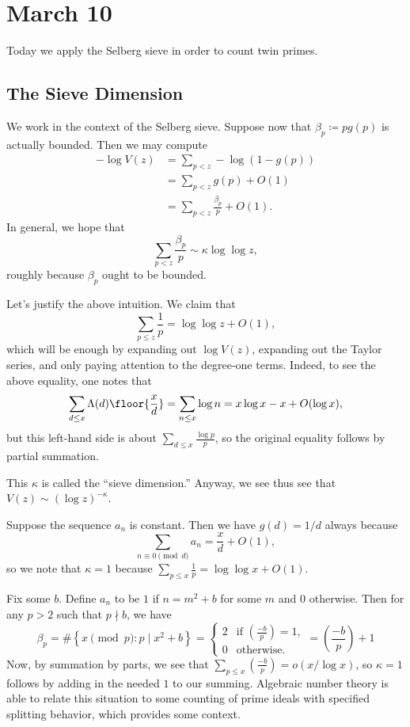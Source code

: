\documentclass[../notes.tex]{subfiles}
\begin{document}
\section{March 10}

Today we apply the Selberg sieve in order to count twin primes.

\subsection{The Sieve Dimension}
We work in the context of the Selberg sieve. Suppose now that $\beta_p\coloneqq pg(p)$ is actually bounded. Then we may compute
\begin{align*}
	-\log V(z) &= \sum_{p<z}-\log(1-g(p)) \\
	&= \sum_{p<z}g(p)+O(1) \\
	&= \sum_{p<z}\frac{\beta_p}p+O(1).
\end{align*}
In general, we hope that
\[\sum_{p<z}\frac{\beta_p}p\sim\kappa\log\log z,\]
roughly because $\beta_p$ ought to be bounded.
\begin{remark}
	Let's justify the above intuition. We claim that
	\[\sum_{p\le z}\frac1p=\log\log z+O(1),\]
	which will be enough by expanding out $\log V(z)$, expanding out the Taylor series, and only paying attention to the degree-one terms. Indeed, to see the above equality, one notes that
	\[\sum_{d\le x}\Lambda(d)\floor{\frac xd}=\sum_{n\le x}\log n=x\log x-x+O(\log x),\]
	but this left-hand side is about $\sum_{d\le x}\frac{\log p}p$, so the original equality follows by partial summation.
\end{remark}
This $\kappa$ is called the ``sieve dimension.'' Anyway, we see thus see that $V(z)\sim(\log z)^{-\kappa}$.
\begin{example}
	Suppose the sequence $a_n$ is constant. Then we have $g(d)=1/d$ always because
	\[\sum_{n\equiv0\pmod d}a_n=\frac xd+O(1),\]
	so we note that $\kappa=1$ because $\sum_{p\le x}\frac1p=\log\log x+O(1)$.
\end{example}
\begin{example}
	Fix some $b$. Define $a_n$ to be $1$ if $n=m^2+b$ for some $m$ and $0$ otherwise. Then for any $p>2$ such that $p\nmid b$, we have
	\[\beta_p=\#\left\{x\pmod p:p\mid x^2+b\right\}=\begin{cases}
		2 & \text{if }\left(\frac{-b}p\right)=1, \\
		0 & \text{otherwise}.
	\end{cases}=\left(\frac{-b}p\right)+1\]
	Now, by summation by parts, we see that $\sum_{p\le x}\left(\frac{-b}p\right)=o(x/\log x)$, so $\kappa=1$ follows by adding in the needed $1$ to our summing. Algebraic number theory is able to relate this situation to some counting of prime ideals with specified splitting behavior, which provides some context.
\end{example}
\end{document}

